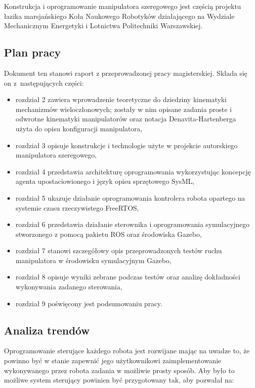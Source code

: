 \documentclass[a4paper, 12pt, twoside]{article}
\begin{document}
Konstrukcja i oprogramowanie manipulatora szeregowego jest częścią projektu łazika marsjańskiego Koła Naukowego Robotyków działającego na Wydziale Mechanicznym Energetyki i Lotnictwa Politechniki Warszawskiej.

\subsection{Plan pracy}

Dokument ten stanowi raport z przeprowadzonej pracy magisterskiej. Składa się on z~następujących części:
\begin{itemize}
\item rozdział 2 zawiera wprowadzenie teoretyczne do dziedziny kinematyki mechanizmów wieloczłonowych; zostały w nim opisane zadania proste i odwrotne kinematyki manipulatorów oraz notacja Denavita-Hartenberga użyta do opisu konfiguracji manipulatora,
\item rozdział 3 opisuje konstrukcje i technologie użyte w projekcie autorskiego manipulatora szeregowego,
\item rozdział 4 przedstawia architekturę oprogramowania wykorzystując koncepcję agenta upostaciowionego i język opisu sprzętowego SysML,
\item rozdział 5 ukazuje działanie oprogramowania kontrolera robota opartego na systemie czasu rzeczywistego FreeRTOS,
\item rozdział 6 przedstawia działanie sterownika i oprogramowania symulacyjnego stworzonego z pomocą pakietu ROS oraz środowiska Gazebo,
\item rozdział 7 stanowi szczegółowy opis przeprowadzonych testów ruchu manipulatora w środowisku symulacyjnym Gazebo,
\item rozdział 8 opisuje wyniki zebrane podczas testów oraz analizę dokładności wykonywania zadanego sterowania,
\item rozdział 9 poświęcony jest podsumowaniu pracy.  
\end{itemize} 

\subsection{Analiza trendów}

Oprogramowanie sterujące każdego robota jest rozwijane mając na uwadze to, że powinno być w stanie zapewnić jego użytkownikowi zaimplementowanie wykonywanego przez robota zadania w możliwie prosty sposób. Aby było to możliwe system sterujący powinien być przygotowany tak, aby pozwalał na:
\end{document}
